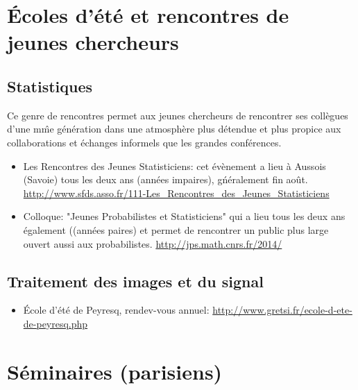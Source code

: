 \section{\'Ecoles d'\'et\'e et rencontres de jeunes chercheurs}


\subsection{Statistiques}
Ce genre de rencontres permet aux jeunes chercheurs de rencontrer ses collègues d'une m\^me génération
dans une atmosphère plus détendue et plus propice aux collaborations et échanges informels que les
grandes conférences. 
\begin{itemize}

\item Les Rencontres des Jeunes Statisticiens: cet \'ev\`enement a lieu \`a Aussois (Savoie) tous les deux ans 
(ann\'ees impaires), 
g\'n\'eralement fin août. \url{http://www.sfds.asso.fr/111-Les_Rencontres_des_Jeunes_Statisticiens}

\item Colloque: "Jeunes Probabilistes et Statisticiens" qui a lieu tous les deux ans \'egalement ((ann\'ees paires)
et permet de rencontrer un public plus large ouvert aussi aux probabilistes. \url{http://jps.math.cnrs.fr/2014/}

\end{itemize}


\subsection{Traitement des images et du signal}



\begin{itemize}
\item \'Ecole d'été de Peyresq, rendev-vous annuel:
\url{http://www.gretsi.fr/ecole-d-ete-de-peyresq.php}
\end{itemize}


\section{Séminaires (parisiens)}

